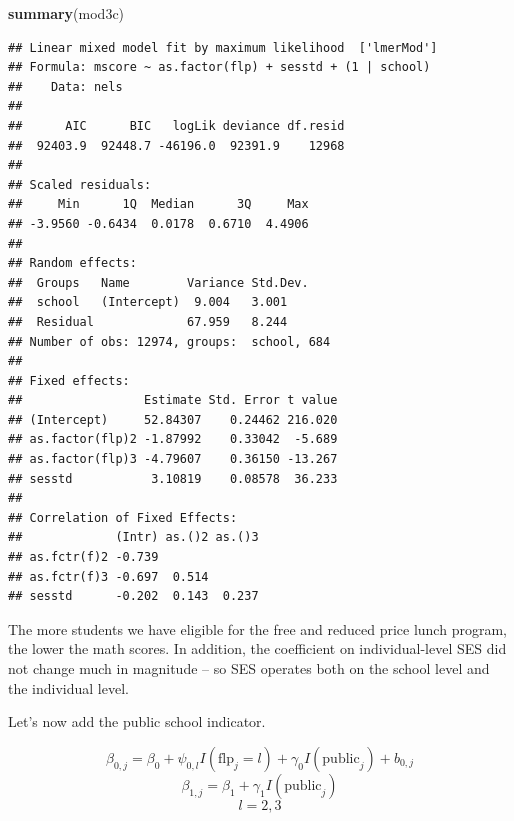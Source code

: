 \documentclass[ignorenonframetext,]{beamer}
\newenvironment{Shaded}{\begin{snugshade}}{\end{snugshade}}
\newcommand{\KeywordTok}[1]{\textcolor[rgb]{0.13,0.29,0.53}{\textbf{#1}}}
\newcommand{\NormalTok}[1]{#1}
\begin{document}
\begin{frame}[fragile]{}

\begin{Shaded}
\begin{Highlighting}[]
\KeywordTok{summary}\NormalTok{(mod3c)}
\end{Highlighting}
\end{Shaded}

\begin{verbatim}
## Linear mixed model fit by maximum likelihood  ['lmerMod']
## Formula: mscore ~ as.factor(flp) + sesstd + (1 | school)
##    Data: nels
## 
##      AIC      BIC   logLik deviance df.resid 
##  92403.9  92448.7 -46196.0  92391.9    12968 
## 
## Scaled residuals: 
##     Min      1Q  Median      3Q     Max 
## -3.9560 -0.6434  0.0178  0.6710  4.4906 
## 
## Random effects:
##  Groups   Name        Variance Std.Dev.
##  school   (Intercept)  9.004   3.001   
##  Residual             67.959   8.244   
## Number of obs: 12974, groups:  school, 684
## 
## Fixed effects:
##                 Estimate Std. Error t value
## (Intercept)     52.84307    0.24462 216.020
## as.factor(flp)2 -1.87992    0.33042  -5.689
## as.factor(flp)3 -4.79607    0.36150 -13.267
## sesstd           3.10819    0.08578  36.233
## 
## Correlation of Fixed Effects:
##             (Intr) as.()2 as.()3
## as.fctr(f)2 -0.739              
## as.fctr(f)3 -0.697  0.514       
## sesstd      -0.202  0.143  0.237
\end{verbatim}

The more students we have eligible for the free and reduced price lunch
program, the lower the math scores. In addition, the coefficient on
individual-level SES did not change much in magnitude -- so SES operates
both on the school level and the individual level.

\end{frame}

\begin{frame}{}

Let's now add the public school indicator.

\[\beta_{0,j}=\beta_0+\psi_{0,l}I(\text{flp}_j=l)+\gamma_0I(\text{public}_j)+b_{0,j}\]
\[\beta_{1,j}=\beta_1+\gamma_1I(\text{public}_j)\] \[l=2,3\]

\end{frame}
\end{document}
